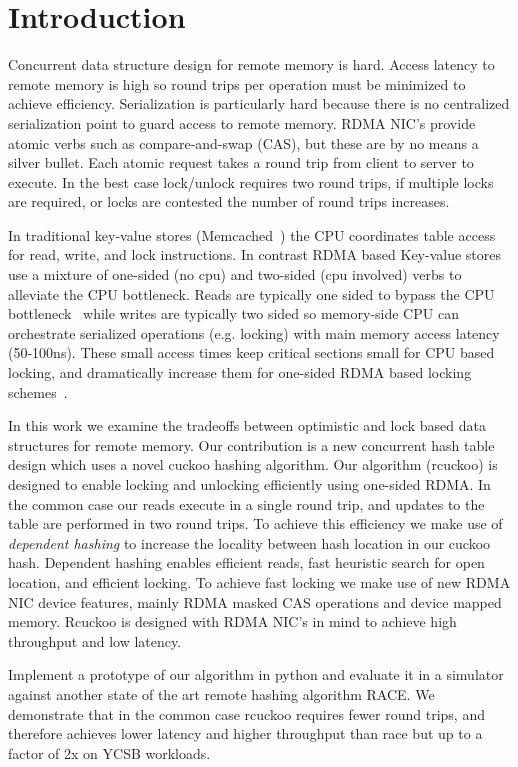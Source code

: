 \section{Introduction}
\label{sec:intro}

Concurrent data structure design for remote memory is hard.
Access latency to remote memory is high so round trips per
operation must be minimized to achieve efficiency.
Serialization is particularly hard because there is no
centralized serialization point to guard access to remote
memory. RDMA NIC's provide atomic verbs such as
compare-and-swap (CAS), but these are by no means a silver
bullet.  Each atomic request takes a round trip from client
to server to execute. In the best case lock/unlock requires
two round trips, if multiple locks are required, or locks
are contested the number of round trips increases.

In traditional key-value stores (Memcached~\cite{memcached})
the CPU coordinates table access for read, write, and lock
instructions. In contrast RDMA based Key-value
stores~\cite{herd,erpc,pilaf} use a mixture of one-sided (no
cpu) and two-sided (cpu involved) verbs to alleviate the CPU
bottleneck. Reads are typically one sided to bypass the CPU
bottleneck~\cite{pilaf,cell} while writes are typically two
sided so memory-side CPU can orchestrate serialized
operations (e.g. locking) with main memory access latency
(50-100ns).  These small access times keep critical sections
small for CPU based locking, and dramatically increase them
for one-sided RDMA based locking schemes~\cite{clover,
sherman}.

In this work we examine the tradeoffs between optimistic and
lock based data structures for remote memory. Our
contribution is a new concurrent hash table design which
uses a novel cuckoo hashing algorithm. Our algorithm
(rcuckoo) is designed to enable locking and unlocking
efficiently using one-sided RDMA. In the common case our
reads execute in a single round trip, and updates to the
table are performed in two round trips. To achieve this
efficiency we make use of \textit{dependent hashing} to
increase the locality between hash location in our cuckoo
hash. Dependent hashing enables efficient reads, fast
heuristic search for open location, and efficient locking.
To achieve fast locking we make use of new RDMA NIC device
features, mainly RDMA masked CAS operations and device
mapped memory. Rcuckoo is designed with RDMA NIC's in mind
to achieve high throughput and low latency.

Implement a prototype of our algorithm in python and
evaluate it in a simulator against another state of the art
remote hashing algorithm RACE. We demonstrate that in the
common case rcuckoo requires fewer round trips, and
therefore achieves lower latency and higher throughput than
race but up to a factor of 2x on YCSB workloads.